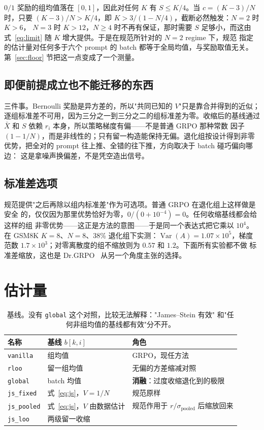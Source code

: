 \documentclass{article}
\newcommand{\Var}{\operatorname{Var}}
\newcommand{\arm}[1]{\texttt{#1}}
\begin{document}
$0/1$ 奖励的组均值落在 $[0,1]$，因此对任何 $K$ 有 $S\le K/4$。当 $c=(K-3)/N$
时，只要 $(K-3)/N>K/4$，即 $K>3/(1-N/4)$，截断必然触发：$N=2$ 时 $K>6$，
$N=3$ 时 $K>12$，$N\ge4$ 时不再有保证，那时需要 $S$ 足够小，而这由
式~\eqref{eq:limit} 随 $K$ 增大提供。于是在规范所针对的 $N=2$ regime 下，规范
指定的估计量对任何多于六个 prompt 的 batch 都等于全局均值，与奖励取值无关。
第~\ref{sec:floor} 节把这一点变成了一个测量。

\subsection{即便前提成立也不能迁移的东西}

三件事。Bernoulli 奖励是异方差的，所以"共同已知的 $V$"只是靠合并得到的近似；
逐组标准差不可用，因为三分之一到三分之二的组标准差为零。收缩后的基线通过
$\bar X$ 和 $S$ 依赖 $r_i$ 本身，所以策略梯度有偏——不是普通 GRPO 那种常数
因子 $(1-1/N)$，而是非线性的；只有留一构造能保持无偏。退化组按设计得到非零
优势，把全对的 prompt 往上推、全错的往下推，方向取决于 batch 碰巧偏向哪边：
这是拿噪声换偏差，不是凭空造出信号。

\subsection{标准差选项}
\label{sec:footgun}

规范提供"之后再除以组内标准差"作为可选项。普通 GRPO 在退化组上这样做是安全
的，仅仅因为那里优势恰好为零，$0/(0+10^{-4})=0$。任何收缩基线都会给这样的组
非零优势——这正是方法的意图——于是同一个表达式把它乘以 $10^4$。在 GSM8K
$K=8$、$N=8$、38\% 退化组下实测：$\Var(A)=1.07\times10^5$，梯度范数
$1.7\times10^3$；对零离散度的组不缩放则为 $0.57$ 和 $1.2$。下面所有实验都不做
标准差缩放，这也是 Dr.GRPO~\citep{liu2025drgrpo} 从另一个角度主张的选择。

\section{估计量}
\label{sec:estimators}

\begin{table}[t]\centering\small
\begin{tabular}{llp{6.4cm}}
\toprule
名称 & 基线 $b[k,i]$ & 角色 \\
\midrule
\arm{vanilla}   & 组均值                          & GRPO，现任方法 \\
\arm{rloo}      & 留一组均值                      & 无偏的方差缩减对照 \\
\arm{global}    & batch 均值                      & \textbf{消融}：过度收缩退化到的极限 \\
\arm{js\_fixed} & 式~\eqref{eq:js}，$V=1/N$        & 规范原样 \\
\arm{js\_pooled}& 式~\eqref{eq:js}，$V$ 由数据估计 & 规范作用于 $r/\sigma_{\text{pooled}}$ 后缩放回来 \\
\arm{js\_loo}   & 两级留一收缩                    & \citet{zeng2025shrinking} \\
\bottomrule
\end{tabular}
\caption{基线。没有 \arm{global} 这个对照，比较无法解释："James--Stein 有效"
和"任何非组均值的基线都有效"分不开。}
\label{tab:arms}
\end{table}
\end{document}
